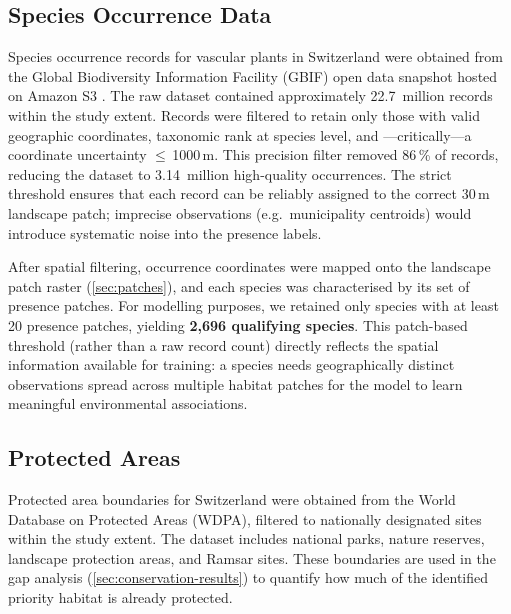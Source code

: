 \subsection{Species Occurrence Data}
\label{sec:species-data}

Species occurrence records for vascular plants in Switzerland were
obtained from the Global Biodiversity Information Facility (GBIF)
open data snapshot hosted on Amazon S3 \citep{GBIF2024}. The raw
dataset contained approximately 22.7~million records within the
study extent. Records were filtered to retain only those with
valid geographic coordinates, taxonomic rank at species level, and
---critically---a coordinate uncertainty $\leq$\,1000\,m. This
precision filter removed 86\,\% of records, reducing the dataset
to 3.14~million high-quality occurrences. The strict threshold
ensures that each record can be reliably assigned to the correct
30\,m landscape patch; imprecise observations (e.g.\ municipality
centroids) would introduce systematic noise into the
presence labels.

After spatial filtering, occurrence coordinates were mapped onto
the landscape patch raster (\cref{sec:patches}), and each species
was characterised by its set of presence patches. For modelling
purposes, we retained only species with at least 20 presence
patches, yielding \textbf{2,696 qualifying species}. This
patch-based threshold (rather than a raw record count) directly
reflects the spatial information available for training:
a species needs geographically distinct observations spread
across multiple habitat patches for the model to learn
meaningful environmental associations.


\subsection{Protected Areas}
\label{sec:protected-areas}

Protected area boundaries for Switzerland were obtained from the World Database on 
Protected Areas (WDPA), filtered to nationally designated sites within the study extent.
The dataset includes national parks, nature reserves, landscape protection areas, and 
Ramsar sites. These boundaries are used in the gap analysis (\cref{sec:conservation-results}) 
to quantify how much of the identified priority habitat is already protected.

